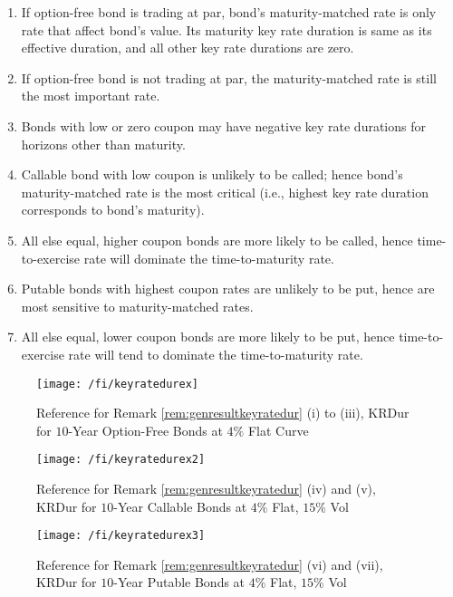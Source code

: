 \begin{remark} 
\label{rem:genresultkeyratedur}
\begin{enumerate}[label=\roman*.]
\setlength{\itemsep}{0pt}
\item If option-free bond is trading at par, bond's maturity-matched rate is only rate that affect bond's value. Its maturity key rate duration is same as its effective duration, and all other key rate durations are zero.
\item If option-free bond is not trading at par, the maturity-matched rate is still the most important rate.
\item Bonds with low or zero coupon may have negative key rate durations for horizons other than maturity.
\item Callable bond with low coupon is unlikely to be called; hence bond's maturity-matched rate is the most critical (i.e., highest key rate duration corresponds to bond's maturity).
\item All else equal, higher coupon bonds are more likely to be called, hence time-to-exercise rate will dominate the time-to-maturity rate.
\item Putable bonds with highest coupon rates are unlikely to be put, hence are most sensitive to maturity-matched rates.
\item All else equal, lower coupon bonds are more likely to be put, hence time-to-exercise rate will tend to dominate the time-to-maturity rate.
\end{enumerate}
\end{remark}

\begin{figure}[H]
\centering
\texttt{[image: /fi/keyratedurex]}
\caption{Reference for Remark \ref{rem:genresultkeyratedur} (i) to (iii), KRDur for $10$-Year Option-Free Bonds at $4\%$ Flat Curve}
\end{figure}

\begin{figure}[H]
\centering
\texttt{[image: /fi/keyratedurex2]}
\caption{Reference for Remark \ref{rem:genresultkeyratedur} (iv) and (v), KRDur for $10$-Year Callable Bonds at $4\%$ Flat, $15\%$ Vol}
\end{figure}

\begin{figure}[H]
\centering
\texttt{[image: /fi/keyratedurex3]}
\caption{Reference for Remark \ref{rem:genresultkeyratedur} (vi) and (vii), KRDur for $10$-Year Putable Bonds at $4\%$ Flat, $15\%$ Vol}
\end{figure}

